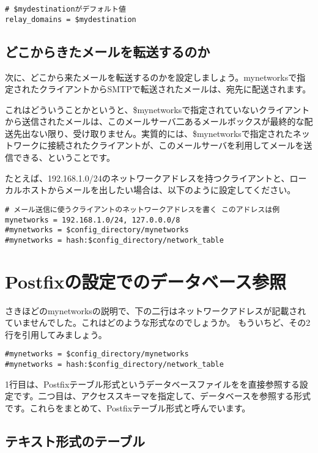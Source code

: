 \begin{lstlisting}[basicstyle=\ttfamily\footnotesize, frame=single]
# $mydestinationがデフォルト値
relay_domains = $mydestination
\end{lstlisting}


\subsection{どこからきたメールを転送するのか}
次に、どこから来たメールを転送するのかを設定しましょう。mynetworksで指定されたクライアントからSMTPで転送されたメールは、宛先に配送されます。

これはどういうことかというと、\$mynetworksで指定されていないクライアントから送信されたメールは、このメールサーバ二あるメールボックスが最終的な配送先出ない限り、受け取りません。実質的には、\$mynetworksで指定されたネットワークに接続されたクライアントが、このメールサーバを利用してメールを送信できる、ということです。

たとえば、192.168.1.0/24のネットワークアドレスを持つクライアントと、ローカルホストからメールを出したい場合は、以下のように設定してください。

\begin{lstlisting}[basicstyle=\ttfamily\footnotesize, frame=single]
# メール送信に使うクライアントのネットワークアドレスを書く このアドレスは例
mynetworks = 192.168.1.0/24, 127.0.0.0/8
#mynetworks = $config_directory/mynetworks
#mynetworks = hash:$config_directory/network_table
\end{lstlisting}

\section{Postfixの設定でのデータベース参照}
さきほどのmynetworksの説明で、下の二行はネットワークアドレスが記載されていませんでした。これはどのような形式なのでしょうか。
もういちど、その2行を引用してみましょう。

\begin{lstlisting}[basicstyle=\ttfamily\footnotesize, frame=single]
#mynetworks = $config_directory/mynetworks
#mynetworks = hash:$config_directory/network_table
\end{lstlisting}

1行目は、Postfixテーブル形式というデータベースファイルをを直接参照する設定です。二つ目は、アクセススキーマを指定して、データベースを参照する形式です。これらをまとめて、Postfixテーブル形式と呼んでいます。

\subsection{テキスト形式のテーブル}

